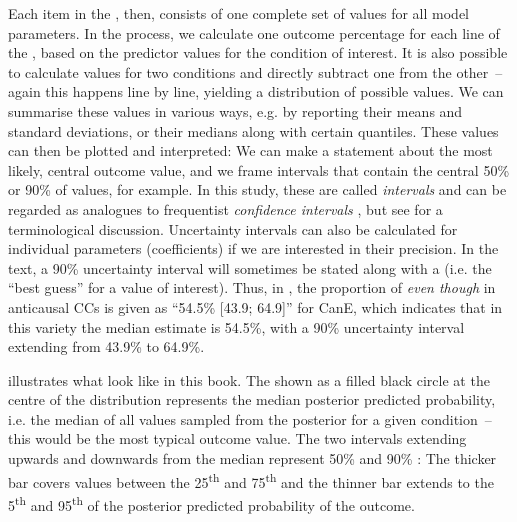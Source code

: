 Each item in the , then, consists of one complete set of values for all model parameters. In the  process, we calculate one outcome percentage for each line of the , based on the predictor values for the condition of interest. It is also possible to calculate values for two conditions and directly subtract one from the other~– again this happens line by line, yielding a distribution of possible values. We can summarise these values in various ways, e.g. by reporting their means and standard deviations, or their medians along with certain quantiles. These values can then be plotted and interpreted: We can make a statement about the most likely, central outcome value, and we frame intervals that contain the central 50\% or 90\% of values, for example. In this study, these are called \textit{ intervals} and can be regarded as analogues to frequentist \textit{confidence intervals} \citep[23]{Agresti2013}, but see \citet{GelmanGreenland2019} for a terminological discussion. Uncertainty intervals can also be calculated for individual parameters (coefficients) if we are interested in their precision. In the text, a 90\% uncertainty interval will sometimes be stated along with a  (i.e. the “best guess” for a value of interest). Thus, in , the proportion of \textit{even though} in anticausal CCs is given as “54.5\% [43.9; 64.9]” for CanE, which indicates that in this variety the median estimate is 54.5\%, with a 90\% uncertainty interval extending from 43.9\% to 64.9\%.

 illustrates what  look like in this book. The  shown as a filled black circle at the centre of the distribution represents the median posterior predicted probability, i.e. the median of all values sampled from the posterior for a given condition~– this would be the most typical outcome value. The two intervals extending upwards and downwards from the median represent 50\% and 90\% : The thicker bar covers values between the 25\textsuperscript{th} and 75\textsuperscript{th}  and the thinner bar extends to the 5\textsuperscript{th} and 95\textsuperscript{th}  of the posterior predicted probability of the outcome.

